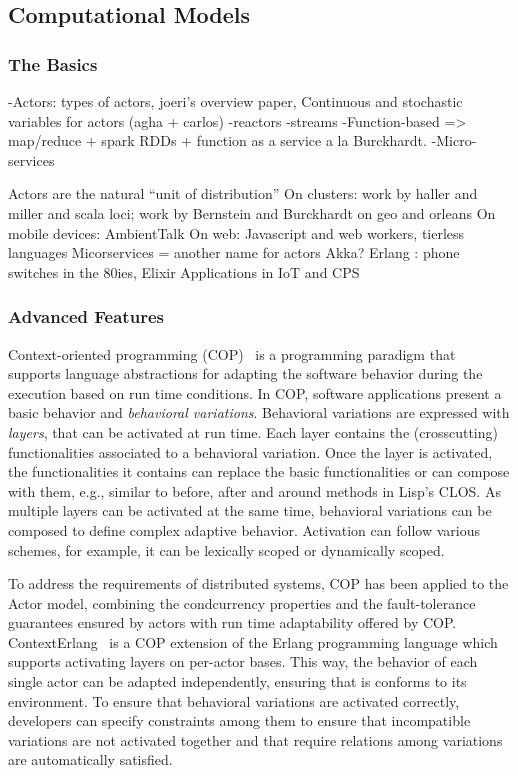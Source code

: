 \documentclass[
graybox,
envcountchap,
]{svmult}
\begin{document}
\begin{bibunit}
\subsection{Computational Models}
\label{sub:sec:comp}

\subsubsection{The Basics} %
\label{sub:sub:sec:comp-basic}
-Actors: types of actors, joeri’s overview paper, Continuous and stochastic variables for actors (agha + carlos)
-reactors
-streams
-Function-based => map/reduce + spark RDDs + function as a service a la Burckhardt.
-Micro-services


Actors are the natural “unit of distribution”
On clusters: work by haller and miller and scala loci; work by Bernstein and Burckhardt on geo and orleans
On mobile devices: AmbientTalk
On web: Javascript and web workers, tierless languages
Micorservices = another name for actors
Akka?
Erlang : phone switches in the 80ies, Elixir
Applications in IoT and CPS


\subsubsection{Advanced Features} %
\label{sub:sub:sec:comp-adv}

Context-oriented programming 
(COP)~\cite{hirschfeld08,Salvaneschi:2012:CPS:2221990.2222313} 
is a programming paradigm that supports
language abstractions for adapting the software behavior during 
the execution based on run time conditions. 
In COP, software applications present a basic behavior and 
{\it behavioral variations}. Behavioral variations are expressed 
with {\it layers}, that can be activated at run time. Each layer
contains the (crosscutting) functionalities associated to a 
behavioral variation. Once the layer is activated, the functionalities
it contains can replace the basic functionalities or can compose with 
them, e.g., similar to before, after and around methods in Lisp's CLOS.
As multiple layers can be activated at the same time, behavioral
variations can be composed to define complex adaptive behavior.
Activation can follow various schemes, for example, it can be lexically
scoped or dynamically scoped.


To address the requirements of distributed systems, COP has been
applied to the Actor model, combining the condcurrency properties and
the fault-tolerance guarantees ensured by actors with run time 
adaptability offered by COP.
%
ContextErlang~\cite{Salvaneschi:2012:CIC:2162049.2162072,ContextErlangSCP} 
is a COP extension of the Erlang programming language
which supports activating layers on per-actor bases. This way, the 
behavior of each single actor can be adapted independently, ensuring
that is conforms to its environment. To ensure that behavioral variations 
are activated correctly, developers can specify constraints among them
to ensure that incompatible variations are not activated together 
and that require relations among variations are automatically satisfied.



\end{bibunit}
\end{document}
